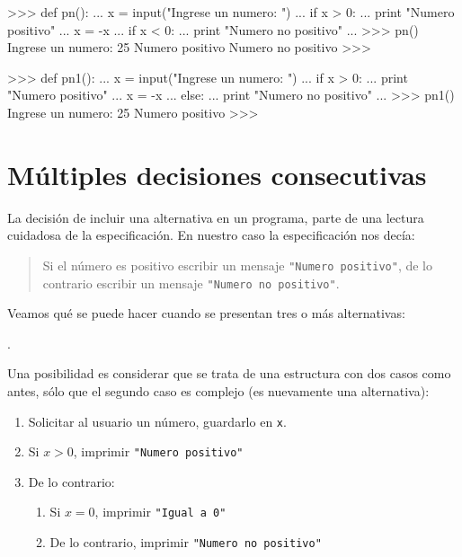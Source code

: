 \noindent
\begin{minipage}[t]{80mm}
\footnotesize
\begin{codigo-python-sn}
>>> def pn():
...     x = input("Ingrese un numero: ")
...     if x > 0:
...        print "Numero positivo"
...        x = -x
...     if x < 0:
...        print "Numero no positivo"
...
>>> pn()
Ingrese un numero: 25
Numero positivo
Numero no positivo
>>>
\end{codigo-python-sn}
\end{minipage}
\begin{minipage}[t]{80mm}
\footnotesize
\begin{codigo-python-sn}
>>> def pn1():
...     x = input("Ingrese un numero: ")
...     if x > 0:
...        print "Numero positivo"
...        x = -x
...     else:
...        print "Numero no positivo"
...
>>> pn1()
Ingrese un numero: 25
Numero positivo
>>>
\end{codigo-python-sn}
\end{minipage}
\normalsize

\section{Múltiples decisiones consecutivas}

La decisión de incluir una alternativa en un programa, parte de una
lectura cuidadosa de la especificación. En nuestro caso la especificación
nos decía:
\begin{quote}
Si el número es positivo escribir un mensaje 
\lstinline!"Numero positivo"!, de lo contrario escribir un mensaje
\lstinline!"Numero no positivo"!.
\end{quote}

Veamos qué se puede hacer cuando se presentan tres o más alternativas:

.

Una posibilidad es considerar que se trata de una estructura con dos
casos como antes, sólo que el segundo caso es complejo (es nuevamente una alternativa):

\begin{enumerate}
\item Solicitar al usuario un número, guardarlo en \lstinline!x!.
\item Si $x>0$, imprimir \lstinline!"Numero positivo"!
\item De lo contrario:
\begin{enumerate}
\item Si $x=0$, imprimir \lstinline!"Igual a 0"!
\item De lo contrario, imprimir \lstinline!"Numero no positivo"!
\end{enumerate}
\end{enumerate}

